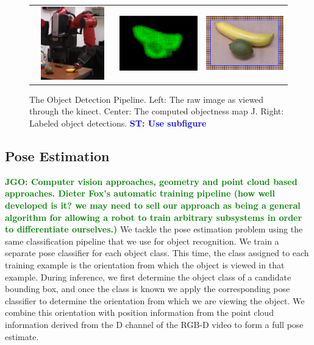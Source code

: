 \documentclass[conference]{IEEEtran}
\newcommand{\stnote}[1]{\textcolor{blue}{\textbf{ST: #1}}}
\newcommand{\jgonote}[1]{\textcolor{green}{\textbf{JGO: #1}}}
\begin{document}
\begin{figure}
  \begin{center}
    \begin{tabular}{l c r}
      \includegraphics[width=160px, height=120px]{kinect.png} &
      \includegraphics[width=160px, height=120px]{objectness.png} &
      \includegraphics[width=160px, height=120px]{blueBoxes.png} \\
    \end{tabular}
  \end{center}
  \caption{The Object Detection Pipeline. Left: The raw image as viewed through the kinect. 
    Center: The computed objectness map J. Right: Labeled object detections. \stnote{Use subfigure}}
\end{figure}

 
\subsection{Pose Estimation}
\jgonote{Computer vision approaches, geometry and point cloud based approaches. Dieter Fox's automatic
training pipeline (how well developed is it? we may need to sell our approach as being a 
general algorithm for allowing a robot to train arbitrary subsystems in order to differentiate 
ourselves.)}
We tackle the pose estimation problem using the same classification pipeline that we use for
object recognition. We train a separate pose classifier for each object class. This time, the class
assigned to each training example is the orientation from which the object is viewed in that example.
During inference, we first determine the object class of a candidate bounding box, and once the class
is known we apply the corresponding pose classifier to determine the orientation from which we
are viewing the object. We combine this orientation with position information from the point cloud
information derived from the D channel of the RGB-D video to form a full pose estimate.
\end{document}
